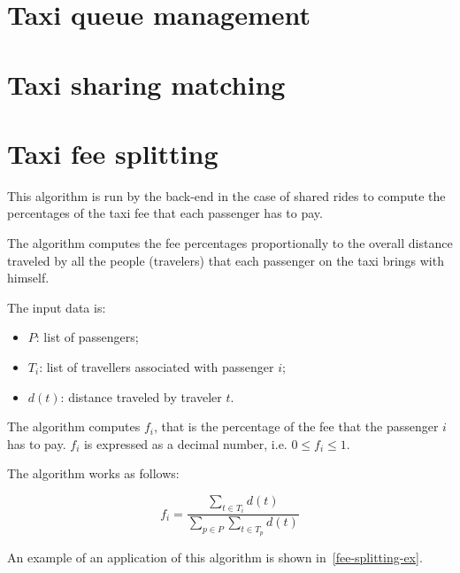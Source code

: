 \section{Taxi queue management}

\section{Taxi sharing matching}

\section{Taxi fee splitting}
This algorithm is run by the back-end in the case of shared rides to compute the percentages of the taxi fee that each passenger has to pay.

The algorithm computes the fee percentages proportionally to the overall distance traveled by all the people (travelers) that each passenger on the taxi brings with himself.

The input data is:
\begin{itemize}
    \item $P$: list of passengers;
    \item $T_i$: list of travellers associated with passenger $i$;
    \item $d(t)$: distance traveled by traveler $t$.
\end{itemize}

The algorithm computes $f_i$, that is the percentage of the fee that the passenger $i$ has to pay.
$f_i$ is expressed as a decimal number, i.e. $0 \le f_i \le 1$.

The algorithm works as follows:

\begin{equation}
    f_i = \dfrac
        {\displaystyle \sum_{t \in T_i} d(t)}
        {\displaystyle \sum_{p \in P} \sum_{t \in T_p} d(t)}
\end{equation}

An example of an application of this algorithm is shown in~\autoref{fee-splitting-ex}.

